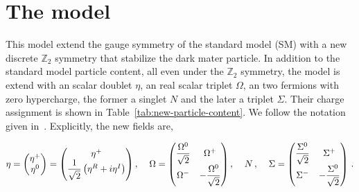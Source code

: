 \documentclass[12pt,letterpaper]{article}
\begin{document}
\section{The model}
\label{sec:model}

This model extend the gauge symmetry of the standard model (SM) with a new discrete $\mathbb{Z}_2$ symmetry that stabilize the dark mater particle. In addition to the standard model particle content, all even under the $\mathbb{Z}_2$ symmetry, the model is extend with an scalar doublet $\eta$, an real scalar triplet $\Omega$, an two fermions with zero hypercharge, the former a singlet $N$ and the later a triplet $\Sigma$. Their charge assignment is shown in Table~\ref{tab:new-particle-content}. We follow the notation given in~\cite{Merle:2016scw, Rocha-Moran:2016enp}. Explicitly, the new fields are,

\begin{align}
\eta = 
\begin{pmatrix}
\eta^+ \\
\eta^0
\end{pmatrix}
=\begin{pmatrix}
\eta^+ \\
\dfrac{1}{\sqrt{2}}\left(\eta^R+i\eta^I\right)
\end{pmatrix}, \;\hspace{0.3 cm}
\Omega = 
\begin{pmatrix}
\dfrac{\Omega^0}{\sqrt{2}} & \Omega^+ \\
\Omega^- & -\dfrac{\Omega^0}{\sqrt{2}}
\end{pmatrix}, \;\hspace{0.3 cm}
N\,, \;\hspace{0.3 cm}
\Sigma = 
\begin{pmatrix}
\dfrac{\Sigma^0}{\sqrt{2}} & \Sigma^+ \\
\Sigma^- & -\dfrac{\Sigma^0}{\sqrt{2}}
\end{pmatrix}\,.
\end{align}

   
\end{document}
